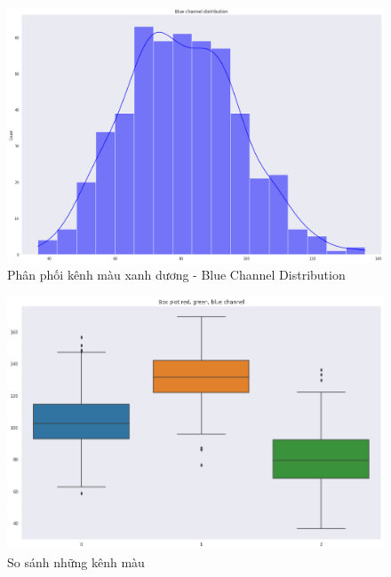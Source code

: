 \documentclass{article}
\begin{document}
	\begin{figure}[H]
		\centering
		\includegraphics[width=1\linewidth]{images/blue_channel_distribution.png}
		\caption{Phân phối kênh màu xanh dương - Blue Channel Distribution}
		\label{fig:writing-thesis}
	\end{figure}
	\begin{figure}[H]
		\centering
		\includegraphics[width=1\linewidth]{images/boxplot_channels_distribution.png}
		\caption{So sánh những kênh màu}
		\label{fig:writing-thesis}
	\end{figure}
\end{document}
